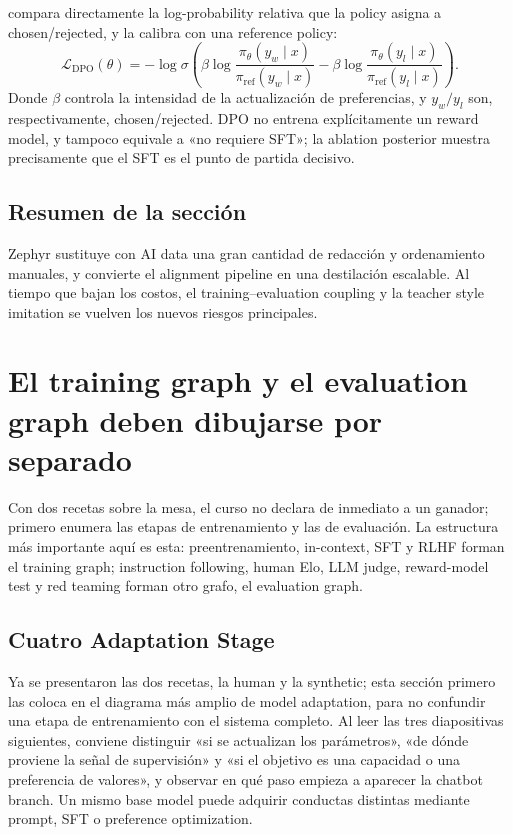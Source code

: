 \documentclass[a4paper]{article}
\begin{document}
 compara directamente la log-probability relativa que la policy asigna a chosen/rejected, y la calibra con una reference policy:
\[
\mathcal{L}_{\mathrm{DPO}}(\theta)
=-\log\sigma\!\left(
\beta\log\frac{\pi_{\theta}(y_w\mid x)}{\pi_{\mathrm{ref}}(y_w\mid x)}
-\beta\log\frac{\pi_{\theta}(y_l\mid x)}{\pi_{\mathrm{ref}}(y_l\mid x)}
\right).
\]
Donde $\beta$ controla la intensidad de la actualización de preferencias, y $y_w/y_l$ son, respectivamente, chosen/rejected. DPO no entrena explícitamente un reward model, y tampoco equivale a «no requiere SFT»; la ablation posterior muestra precisamente que el SFT es el punto de partida decisivo.


\subsection{Resumen de la sección}

Zephyr sustituye con AI data una gran cantidad de redacción y ordenamiento manuales, y convierte el alignment pipeline en una destilación escalable. Al tiempo que bajan los costos, el training--evaluation coupling y la teacher style imitation se vuelven los nuevos riesgos principales.
\section{El training graph y el evaluation graph deben dibujarse por separado}

Con dos recetas sobre la mesa, el curso no declara de inmediato a un ganador; primero enumera las etapas de entrenamiento y las de evaluación. La estructura más importante aquí es esta: preentrenamiento, in-context, SFT y RLHF forman el training graph; instruction following, human Elo, LLM judge, reward-model test y red teaming forman otro grafo, el evaluation graph.

\subsection{Cuatro Adaptation Stage}

Ya se presentaron las dos recetas, la human y la synthetic; esta sección primero las coloca en el diagrama más amplio de model adaptation, para no confundir una etapa de entrenamiento con el sistema completo. Al leer las tres diapositivas siguientes, conviene distinguir «si se actualizan los parámetros», «de dónde proviene la señal de supervisión» y «si el objetivo es una capacidad o una preferencia de valores», y observar en qué paso empieza a aparecer la chatbot branch. Un mismo base model puede adquirir conductas distintas mediante prompt, SFT o preference optimization.
\end{document}
